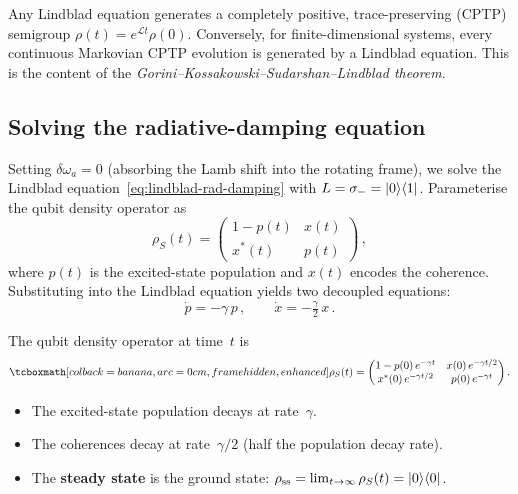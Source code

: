 \begin{keyresult}
  Any Lindblad equation generates a completely positive, trace-preserving
  (CPTP) semigroup $\rho(t) = e^{\mathcal{L}t}\rho(0)$.
  Conversely, for finite-dimensional systems, every continuous
  Markovian CPTP evolution is generated by a Lindblad equation.  This
  is the content of the \emph{Gorini--Kossakowski--Sudarshan--Lindblad
  theorem}.
\end{keyresult}

\subsection{Solving the radiative-damping equation}%
\label{sec:solve-rad-damping}

Setting $\delta\omega_a = 0$ (absorbing the Lamb shift into the
rotating frame), we solve the Lindblad
equation~\eqref{eq:lindblad-rad-damping} with
$L = \sigma_- = \lvert 0 \rangle\langle 1 \rvert$.  Parameterise the qubit density
operator as
\begin{equation}\label{eq:rho-param}
  \rho_S(t)
  = \begin{pmatrix} 1 - p(t) & x(t) \\ x^*(t) & p(t) \end{pmatrix}\,,
\end{equation}
where $p(t)$ is the excited-state population and $x(t)$ encodes the
coherence.  Substituting into the Lindblad equation yields two
decoupled equations:
\begin{equation}\label{eq:ode-rad-damping}
  \dot{p} = -\gamma\, p\,,
  \qquad
  \dot{x} = -\tfrac{\gamma}{2}\,x\,.
\end{equation}

\begin{keyresult}
  The qubit density operator at time~$t$ is
  \begin{equation}\label{eq:rho-rad-solution}
    \eqbox{%
    \rho_S(t)
    = \begin{pmatrix}
        1 - p(0)\,e^{-\gamma t} & x(0)\,e^{-\gamma t/2} \\
        x^*(0)\,e^{-\gamma t/2} & p(0)\,e^{-\gamma t}
      \end{pmatrix}}\,.
  \end{equation}
  \begin{itemize}
    \item The excited-state population decays at rate~$\gamma$.
    \item The coherences decay at rate~$\gamma/2$ (half the population
      decay rate).
    \item The \textbf{steady state} is the ground state:
      $\rho_{\mathrm{ss}} = \lim_{t\to\infty}\rho_S(t) = \lvert 0 \rangle\langle 0 \rvert$.
  \end{itemize}
\end{keyresult}

